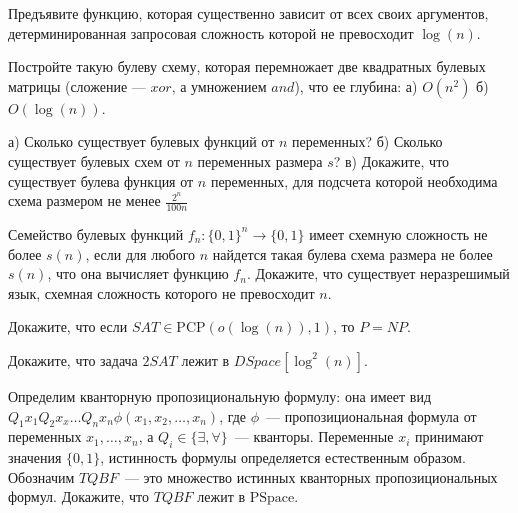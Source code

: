 \setcounter{curtask}{47}


\begin{task}
    Предъявите функцию, которая существенно зависит от всех своих аргументов,
    детерминированная запросовая сложность которой не превосходит $\log(n)$.
\end{task}

\begin{task}
    Постройте такую булеву схему, которая перемножает две квадратных булевых матрицы
    (сложение --- $xor$, а умножением $and$), что ее глубина:
    а) $O(n^2)$
    б) $O(\log(n))$.
\end{task}

\begin{task}
    а) Сколько существует булевых функций от $n$ переменных?
    б) Сколько существует булевых схем от $n$ переменных размера $s$?
    в) Докажите, что существует булева функция от $n$ переменных, для подсчета
    которой необходима схема размером не менее $\frac{2^n}{100n}$
\end{task}

\begin{task}
    Семейство булевых функций $f_n: \{0, 1\}^n \rightarrow \{0, 1\}$ имеет схемную
    сложность не более $s(n)$, если для любого $n$ найдется такая булева схема
    размера не более $s(n)$, что она вычисляет функцию $f_n$.
    Докажите, что существует неразрешимый язык, схемная сложность которого не
    превосходит $n$.
\end{task}

\breakline

\begin{ptask}{39}
    Докажите, что если $SAT \in \mathrm{PCP}(o(\log(n)), 1)$, то $P = NP$.
\end{ptask}

\begin{ptask}{41}
	Докажите, что задача $2SAT$ лежит в $DSpace[\log^2(n)]$.    
\end{ptask}

\begin{ptask}{42}
	Определим кванторную пропозициональную формулу: она имеет вид \\
    $Q_1 x_1 Q_2 x_x \dots Q_n x_n \phi(x_1, x_2, \dots, x_n)$, где $\phi$~---
    пропозициональная формула от переменных $x_1, \dots, x_n$, а $Q_i \in \{\exists,
    \forall\}$~--- кванторы. Переменные $x_i$ принимают значения $\{0, 1\}$,
    истинность формулы определяется естественным образом. Обозначим $TQBF$~--- это
    множество истинных кванторных пропозициональных формул. Докажите, что $TQBF$
    лежит в $\mathrm{PSpace}$.
\end{ptask}

